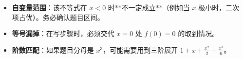 \begin{trapbox}
\begin{itemize}
    \item \textbf{自变量范围}：该不等式在 $x < 0$ 时**不一定成立**（例如当 $x$ 极小时，二次项占优）。务必确认题目区间。
    \item \textbf{等号漏掉}：在写步骤时，必须交代 $x=0$ 处 $f(0)=0$ 的取到情况。
    \item \textbf{阶数匹配}：如果题目分母是 $x^3$，可能需要用到三阶展开 $1 + x + \frac{x^2}{2} + \frac{x^3}{6}$。
\end{itemize}
\end{trapbox}